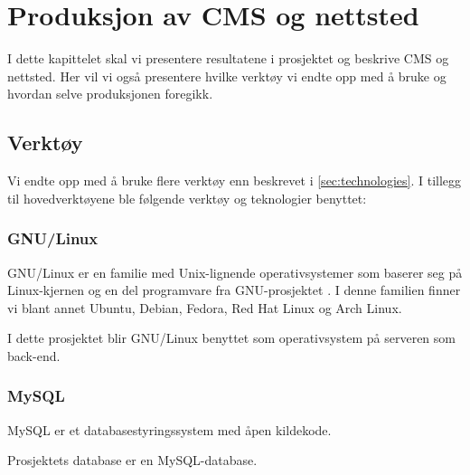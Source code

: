 \cleardoublepage
\chapter{Produksjon av CMS og nettsted}
\label{chap:implementation} 


I dette kapittelet skal vi presentere resultatene i prosjektet og beskrive CMS og nettsted. Her vil vi også presentere hvilke verktøy vi endte opp med å bruke og hvordan selve produksjonen foregikk.

\section{Verktøy}
Vi endte opp med å bruke flere verktøy enn beskrevet i  \ref{sec:technologies}. 
I tillegg til hovedverktøyene ble følgende verktøy og teknologier benyttet:

\subsection{GNU/Linux}
GNU/Linux er en familie med Unix-lignende operativsystemer som baserer seg på Linux-kjernen \cite{kernel_org} og en del programvare fra GNU-prosjektet \cite{gnu_org}. I denne familien finner vi blant annet Ubuntu, Debian, Fedora, Red Hat Linux og Arch Linux.

I dette prosjektet blir GNU/Linux benyttet som operativsystem på serveren som  back-end.

\subsection{MySQL}
MySQL \cite{oracle2019am} er et databasestyringssystem med åpen kildekode.

Prosjektets database er en MySQL-database.


